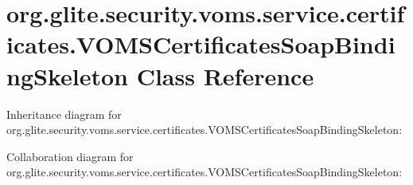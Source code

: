 \hypertarget{classorg_1_1glite_1_1security_1_1voms_1_1service_1_1certificates_1_1VOMSCertificatesSoapBindingSkeleton}{
\section{org.glite.security.voms.service.certificates.VOMSCertificatesSoapBindingSkeleton Class Reference}
\label{classorg_1_1glite_1_1security_1_1voms_1_1service_1_1certificates_1_1VOMSCertificatesSoapBindingSkeleton}
}


Inheritance diagram for org.glite.security.voms.service.certificates.VOMSCertificatesSoapBindingSkeleton:


Collaboration diagram for org.glite.security.voms.service.certificates.VOMSCertificatesSoapBindingSkeleton:
